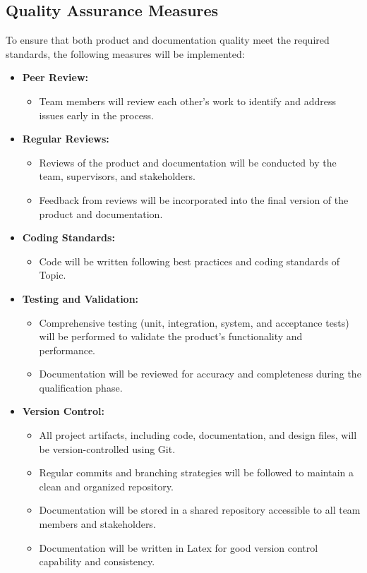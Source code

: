 \documentclass{article}
\begin{document}
\subsection{Quality Assurance Measures}
To ensure that both product and documentation quality meet the required standards, the following measures will be implemented:
\begin{itemize}[leftmargin=*, label={}]
    \item \textbf{Peer Review:}
        \begin{itemize}
            \item Team members will review each other's work to identify and address issues early in the process.
        \end{itemize}
    \item \textbf{Regular Reviews:}
        \begin{itemize}
            \item Reviews of the product and documentation will be conducted by the team, supervisors, and stakeholders.
            \item Feedback from reviews will be incorporated into the final version of the product and documentation.
        \end{itemize}
    \item \textbf{Coding Standards:}
        \begin{itemize}
            \item Code will be written following best practices and coding standards of Topic.
        \end{itemize}
    \item \textbf{Testing and Validation:}
        \begin{itemize}
            \item Comprehensive testing (unit, integration, system, and acceptance tests) will be performed to validate the product's functionality and performance.
            \item Documentation will be reviewed for accuracy and completeness during the qualification phase.
        \end{itemize}
    \item \textbf{Version Control:}
        \begin{itemize}
            \item All project artifacts, including code, documentation, and design files, will be version-controlled using Git.
            \item Regular commits and branching strategies will be followed to maintain a clean and organized repository.
            \item Documentation will be stored in a shared repository accessible to all team members and stakeholders.
            \item Documentation will be written in Latex for good version control capability and consistency.
        \end{itemize}
\end{itemize}
\end{document}
